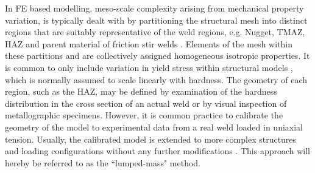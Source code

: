 In FE based modelling, meso-scale complexity arising from mechanical property variation, is typically dealt with by partitioning the structural mesh into distinct regions that are suitably representative of the weld regions, e.g. Nugget, TMAZ, HAZ and parent material of friction stir welds \cite{McWilliams2013,Grujicic2011}. Elements of the mesh within these partitions and are collectively assigned homogeneous isotropic properties.
It is common to only include variation in yield stress within  structural models
, which is normally assumed to scale linearly with hardness. The geometry of each region, such as the HAZ, may be defined by examination of the hardness distribution in the cross section of an actual weld or by visual inspection of metallographic specimens. However, it is common practice to calibrate the geometry of the model to experimental data from a real weld loaded in uniaxial tension. Usually, the calibrated model is extended to more complex structures and loading configurations without any further modifications \cite{McWilliams2013,Grujicic2011a}. This approach will hereby be referred to as the ``lumped-mass" method. 

